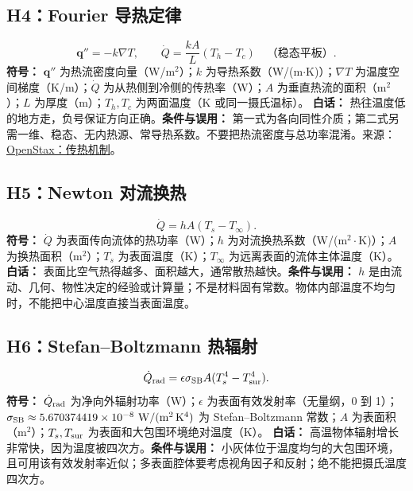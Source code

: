 \subsection{H4：Fourier 导热定律}
\begin{equation}
\mathbf q''=-k\nabla T,\qquad \dot Q=\frac{kA}{L}(T_h-T_c)\quad\text{（稳态平板）}.
\end{equation}
\textbf{符号：} $\mathbf q''$ 为热流密度向量（W/m$^2$）；$k$ 为导热系数（W/(m$\cdot$K)）；$\nabla T$ 为温度空间梯度（K/m）；$\dot Q$ 为从热侧到冷侧的传热率（W）；$A$ 为垂直热流的面积（m$^2$）；$L$ 为厚度（m）；$T_h,T_c$ 为两面温度（K 或同一摄氏温标）。
\textbf{白话：} 热往温度低的地方走，负号保证方向正确。\textbf{条件与误用：} 第一式为各向同性介质；第二式另需一维、稳态、无内热源、常导热系数。不要把热流密度与总功率混淆。来源：\href{https://openstax.org/books/university-physics-volume-2/pages/1-6-mechanisms-of-heat-transfer}{OpenStax：传热机制}。

\subsection{H5：Newton 对流换热}
\begin{equation}
\dot Q=hA(T_s-T_\infty).
\end{equation}
\textbf{符号：} $\dot Q$ 为表面传向流体的热功率（W）；$h$ 为对流换热系数（W/(m$^2\cdot$K)）；$A$ 为换热面积（m$^2$）；$T_s$ 为表面温度（K）；$T_\infty$ 为远离表面的流体主体温度（K）。
\textbf{白话：} 表面比空气热得越多、面积越大，通常散热越快。\textbf{条件与误用：} $h$ 是由流动、几何、物性决定的经验或计算量；不是材料固有常数。物体内部温度不均匀时，不能把中心温度直接当表面温度。

\subsection{H6：Stefan--Boltzmann 热辐射}
\begin{equation}
\dot Q_{\rm rad}=\epsilon\sigma_{\rm SB}A(T_s^4-T_{\rm sur}^4).
\end{equation}
\textbf{符号：} $\dot Q_{\rm rad}$ 为净向外辐射功率（W）；$\epsilon$ 为表面有效发射率（无量纲，0 到 1）；$\sigma_{\rm SB}\approx5.670374419\times10^{-8}\ \mathrm{W/(m^2\,K^4)}$ 为 Stefan--Boltzmann 常数；$A$ 为表面积（m$^2$）；$T_s,T_{\rm sur}$ 为表面和大包围环境绝对温度（K）。
\textbf{白话：} 高温物体辐射增长非常快，因为温度被四次方。\textbf{条件与误用：} 小灰体位于温度均匀的大包围环境，且可用该有效发射率近似；多表面腔体要考虑视角因子和反射；绝不能把摄氏温度四次方。

